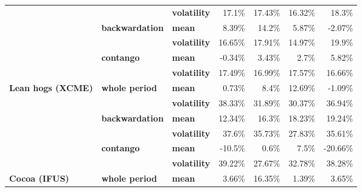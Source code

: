 \documentclass[
  authoryear,
  preprint,
  3p]{elsarticle}
\begin{document}
\begin{longtable}[t]{>{}l>{}l>{}l>{}r>{}r>{}r>{}r}
\textbf{} & \textbf{} & \textbf{volatility} & \textcolor[HTML]{4285f4}{17.1\%} & \textcolor[HTML]{4285f4}{17.43\%} & \textcolor[HTML]{4285f4}{16.32\%} & \textcolor[HTML]{4285f4}{18.3\%}\\
\textbf{} & \textbf{backwardation} & \textbf{mean} & \textcolor[HTML]{4285f4}{8.39\%} & \textcolor[HTML]{4285f4}{14.2\%} & \textcolor[HTML]{4285f4}{5.87\%} & \textcolor[HTML]{4285f4}{-2.07\%}\\
\addlinespace
\textbf{} & \textbf{} & \textbf{volatility} & \textcolor[HTML]{4285f4}{16.65\%} & \textcolor[HTML]{4285f4}{17.91\%} & \textcolor[HTML]{4285f4}{14.97\%} & \textcolor[HTML]{4285f4}{19.9\%}\\
\textbf{} & \textbf{contango} & \textbf{mean} & \textcolor[HTML]{4285f4}{-0.34\%} & \textcolor[HTML]{4285f4}{3.43\%} & \textcolor[HTML]{4285f4}{2.7\%} & \textcolor[HTML]{4285f4}{5.82\%}\\
\textbf{} & \textbf{} & \textbf{volatility} & \textcolor[HTML]{4285f4}{17.49\%} & \textcolor[HTML]{4285f4}{16.99\%} & \textcolor[HTML]{4285f4}{17.57\%} & \textcolor[HTML]{4285f4}{16.66\%}\\
\textbf{Lean hogs (XCME)} & \textbf{whole period} & \textbf{mean} & \textcolor[HTML]{4285f4}{0.73\%} & \textcolor[HTML]{4285f4}{8.4\%} & \textcolor[HTML]{4285f4}{12.69\%} & \textcolor[HTML]{4285f4}{-1.09\%}\\
\textbf{} & \textbf{} & \textbf{volatility} & \textcolor[HTML]{4285f4}{38.33\%} & \textcolor[HTML]{4285f4}{31.89\%} & \textcolor[HTML]{4285f4}{30.37\%} & \textcolor[HTML]{4285f4}{36.94\%}\\
\addlinespace
\textbf{} & \textbf{backwardation} & \textbf{mean} & \textcolor[HTML]{4285f4}{12.34\%} & \textcolor[HTML]{4285f4}{16.3\%} & \textcolor[HTML]{4285f4}{18.23\%} & \textcolor[HTML]{4285f4}{19.24\%}\\
\textbf{} & \textbf{} & \textbf{volatility} & \textcolor[HTML]{4285f4}{37.6\%} & \textcolor[HTML]{4285f4}{35.73\%} & \textcolor[HTML]{4285f4}{27.83\%} & \textcolor[HTML]{4285f4}{35.61\%}\\
\textbf{} & \textbf{contango} & \textbf{mean} & \textcolor[HTML]{4285f4}{-10.5\%} & \textcolor[HTML]{4285f4}{0.6\%} & \textcolor[HTML]{4285f4}{7.5\%} & \textcolor[HTML]{4285f4}{-20.66\%}\\
\textbf{} & \textbf{} & \textbf{volatility} & \textcolor[HTML]{4285f4}{39.22\%} & \textcolor[HTML]{4285f4}{27.67\%} & \textcolor[HTML]{4285f4}{32.78\%} & \textcolor[HTML]{4285f4}{38.28\%}\\
\textbf{Cocoa (IFUS)} & \textbf{whole period} & \textbf{mean} & \textcolor[HTML]{4285f4}{3.66\%} & \textcolor[HTML]{4285f4}{16.35\%} & \textcolor[HTML]{4285f4}{1.39\%} & \textcolor[HTML]{4285f4}{3.65\%}\\

\end{longtable}
\end{document}
